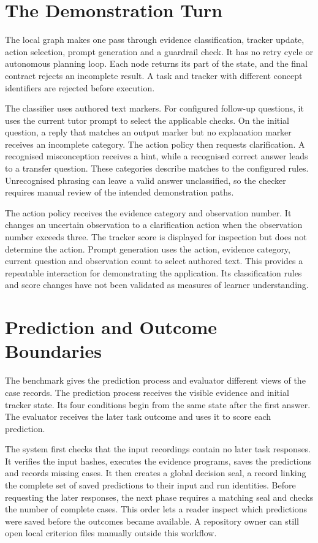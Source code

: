 \section{The Demonstration Turn}

The local graph makes one pass through evidence classification, tracker update, action selection, prompt generation and a
guardrail check. It has no retry cycle or autonomous planning loop. Each node returns its part of the state, and the final
contract rejects an incomplete result. A task and tracker with different concept identifiers are rejected before execution.

The classifier uses authored text markers. For configured follow-up questions, it uses the current tutor prompt to select
the applicable checks. On the initial question, a reply that matches an output marker but no explanation marker receives an
incomplete category.
The action policy then requests clarification. A recognised misconception receives a hint, while a recognised correct answer
leads to a transfer question. These categories describe matches to the configured rules. Unrecognised phrasing can leave a
valid answer unclassified, so the checker requires manual review of the intended demonstration paths.

The action policy receives the evidence category and observation number. It changes an uncertain observation to a
clarification action when the observation number exceeds three. The tracker score is displayed for inspection but does not
determine the action. Prompt generation uses the action, evidence category, current question and observation count to select
authored text. This provides a repeatable interaction for demonstrating the application. Its classification rules and score
changes have not been validated as measures of learner understanding.

\section{Prediction and Outcome Boundaries}

The benchmark gives the prediction process and evaluator different views of the case records. The prediction process receives
the visible evidence and initial tracker state. Its four conditions begin from the same state after the first answer. The
evaluator receives the later task outcome and uses it to score each prediction.

The system first checks that the input recordings contain no later task responses. It verifies the input hashes, executes
the evidence programs, saves the predictions and records missing cases. It then creates a global decision seal, a record
linking the complete set of saved predictions to their input and run identities. Before requesting the later responses, the
next phase requires a matching seal and checks the number of complete cases. This order lets a reader inspect which
predictions were saved before the outcomes became available. A repository owner can still open local criterion files manually
outside this workflow.

